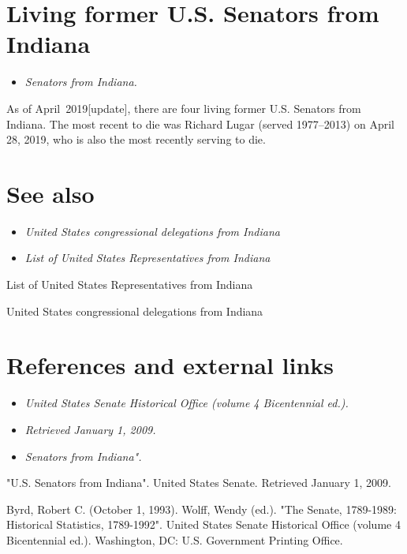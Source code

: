 \section{Living former U.S. Senators from
Indiana}\label{living-former-u.s.-senators-from-indiana}

\begin{itemize}
\item
  \emph{Senators from Indiana.}
\end{itemize}

As of April~2019{[}update{]}, there are four living former U.S. Senators
from Indiana. The most recent to die was Richard Lugar (served
1977--2013) on April 28, 2019, who is also the most recently serving to
die.

\section{See also}\label{see-also}

\begin{itemize}
\item
  \emph{United States congressional delegations from Indiana}
\item
  \emph{List of United States Representatives from Indiana}
\end{itemize}

List of United States Representatives from Indiana

United States congressional delegations from Indiana

\section{References and external
links}\label{references-and-external-links}

\begin{itemize}
\item
  \emph{United States Senate Historical Office (volume 4 Bicentennial
  ed.).}
\item
  \emph{Retrieved January 1, 2009.}
\item
  \emph{Senators from Indiana".}
\end{itemize}

"U.S. Senators from Indiana". United States Senate. Retrieved January 1,
2009.

Byrd, Robert C. (October 1, 1993). Wolff, Wendy (ed.). "The Senate,
1789-1989: Historical Statistics, 1789-1992". United States Senate
Historical Office (volume 4 Bicentennial ed.). Washington, DC: U.S.
Government Printing Office.
